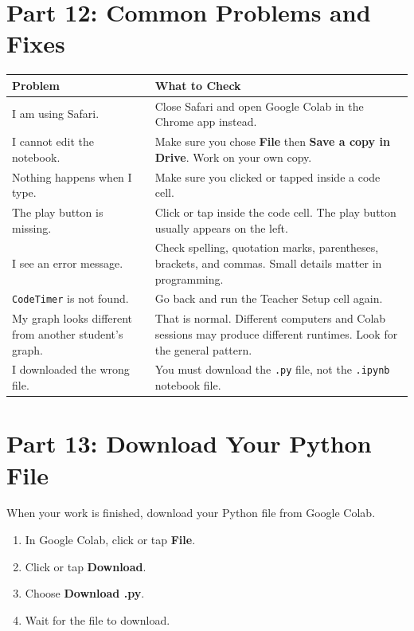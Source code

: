 \documentclass[11pt]{article}
\begin{document}
\section*{Part 12: Common Problems and Fixes}

\begin{center}
\begin{longtable}{|>{\raggedright}p{2.2in}|>{\raggedright\arraybackslash}p{4.1in}|}
\hline
\textbf{Problem} & \textbf{What to Check} \\
\hline
I am using Safari. & Close Safari and open Google Colab in the Chrome app instead. \\
\hline
I cannot edit the notebook. & Make sure you chose \textbf{File} then \textbf{Save a copy in Drive}. Work on your own copy. \\
\hline
Nothing happens when I type. & Make sure you clicked or tapped inside a code cell. \\
\hline
The play button is missing. & Click or tap inside the code cell. The play button usually appears on the left. \\
\hline
I see an error message. & Check spelling, quotation marks, parentheses, brackets, and commas. Small details matter in programming. \\
\hline
\texttt{CodeTimer} is not found. & Go back and run the Teacher Setup cell again. \\
\hline
My graph looks different from another student's graph. & That is normal. Different computers and Colab sessions may produce different runtimes. Look for the general pattern. \\
\hline
I downloaded the wrong file. & You must download the \texttt{.py} file, not the \texttt{.ipynb} notebook file. \\
\hline
\end{longtable}
\end{center}

\section*{Part 13: Download Your Python File}

When your work is finished, download your Python file from Google Colab.

\begin{enumerate}
    \item In Google Colab, click or tap \textbf{File}.
    \item Click or tap \textbf{Download}.
    \item Choose \textbf{Download .py}.
    \item Wait for the file to download.
\end{enumerate}
\end{document}
